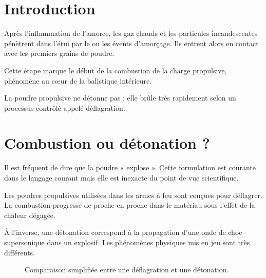 
\section{Introduction}

Après l'inflammation de l'amorce, les gaz chauds et les particules
incandescentes pénètrent dans l'étui par le ou les évents d'amorçage. Ils
entrent alors en contact avec les premiers grains de poudre.

Cette étape marque le début de la combustion de la charge propulsive, phénomène
au cœur de la balistique intérieure.

\begin{aretenir}

La poudre propulsive ne détonne pas : elle brûle très rapidement selon un
processus contrôlé appelé déflagration.

\end{aretenir}

\section{Combustion ou détonation ?}

Il est fréquent de dire que la poudre « explose ». Cette formulation est
courante dans le langage courant mais elle est inexacte du point de vue
scientifique.

Les poudres propulsives utilisées dans les armes à feu sont conçues pour
déflagrer. La combustion progresse de proche en proche dans le matériau sous
l'effet de la chaleur dégagée.

À l'inverse, une détonation correspond à la propagation d'une onde de choc
supersonique dans un explosif. Les phénomènes physiques mis en jeu sont très
différents.

\begin{figure}[htbp]
\centering


\caption{Comparaison simplifiée entre une déflagration et une détonation.}
\label{fig:deflagration_detonation}

\end{figure}

